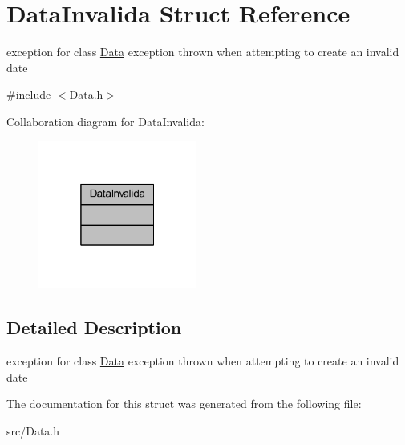 \hypertarget{struct_data_invalida}{}\section{Data\+Invalida Struct Reference}
\label{struct_data_invalida}


exception for class \hyperlink{class_data}{Data} exception thrown when attempting to create an invalid date  




{\ttfamily \#include $<$Data.\+h$>$}



Collaboration diagram for Data\+Invalida\+:
\nopagebreak
\begin{figure}[H]
\begin{center}
\leavevmode
\includegraphics[width=148pt]{struct_data_invalida__coll__graph}
\end{center}
\end{figure}


\subsection{Detailed Description}
exception for class \hyperlink{class_data}{Data} exception thrown when attempting to create an invalid date 

The documentation for this struct was generated from the following file\+:\begin{DoxyCompactItemize}
\item 
src/Data.\+h\end{DoxyCompactItemize}
